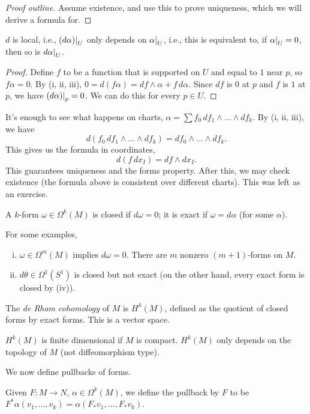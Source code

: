 \begin{proof}[Proof outline]
    Assume existence, and use this to prove uniqueness, which we will derive a formula for.
\end{proof}
\begin{lemma}
    $d$ is local, i.e., $\restr{(d\alpha)}{U}$ only depends on $\restr{\alpha}{U}$, i.e., this is equivalent to, if $\restr{\alpha}{U} = 0$, then so is $\restr{d\alpha}{U}$.
\end{lemma}
\begin{proof}
    Define $f$ to be a function that is supported on $U$ and equal to $1$ near $p$, so $f \alpha = 0$. By (i, ii, iii), $0 = d(f\alpha) = df \wedge \alpha + f \, d\alpha$. Since $df$ is $0$ at $p$ and $f$ is $1$ at $p$, we have $\restr{(d\alpha)}{p} = 0$. We can do this for every $p \in U$. 
\end{proof}
It's enough to see what happens on charts, $\alpha = \sum f_0 \, df_1 \wedge \dots \wedge df_k$. By (i, ii, iii), we have
\[ d(f_0 \, df_1 \wedge \dots \wedge df_k) = df_0 \wedge \dots \wedge df_k. \]
This gives us the formula in coordinates,
\[ d(f \, dx_I) = df \wedge dx_I. \]
This guarantees uniqueness and the forms property. After this, we may check existence (the formula above is consistent over different charts). This was left as an exercise.
\begin{definition}
    A $k$-form $\omega \in \Omega^k(M)$ is closed if $d\omega = 0$; it is exact if $\omega = d\alpha$ (for some $\alpha$).
\end{definition}
For some examples,
\begin{enumerate}[(i)]
    \item $\omega \in \Omega^m(M)$ implies $d\omega = 0$. There are $m$ nonzero $(m+1)$-forms on $M$.
    \item $d\theta \in \Omega^1(S^1)$ is closed but not exact (on the other hand, every exact form is closed by (iv)).
\end{enumerate}
\begin{definition}
    The \textit{de Rham cohomology} of $M$ is $H^k(M)$, defined as the quotient of closed forms by exact forms. This is a vector space.
\end{definition}
\begin{fact}
    $H^k(M)$ is finite dimensional if $M$ is compact. $H^k(M)$ only depends on the topology of $M$ (not diffeomorphism type).
\end{fact}
We now define pullbacks of forms.
\begin{definition}
    Given $F \colon M \to N$, $\alpha \in \Omega^k(M)$, we define the pullback by $F$ to be $F^\ast \alpha(v_1, \dots, v_k) = \alpha(F_\ast v_1, \dots, F_\ast v_k)$.
\end{definition}
